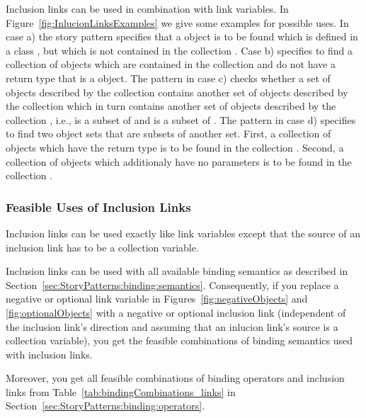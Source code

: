 Inclusion links can be used in combination with link variables.
In Figure~\ref{fig:InlucionLinksExamples} we give some examples for possible uses.
In case a) the story pattern specifies that a  object is to be found which is defined in a class ,
but which is not contained in the collection .
Case b) specifies to find a collection  of  objects which are contained in the collection 
and do not have a return type that is a  object.
The pattern in case c) checks whether a set of objects described by the collection  contains another set of objects described by the collection 
which in turn contains another set of objects described by the collection ,
i.e.,  is a subset of  and  is a subset of .
The pattern in case d) specifies to find two object sets that are subsets of another set.
First, a collection  of  objects which have the return type  is to be found in the collection .
Second, a collection  of  objects which additionaly have no parameters is to be found in the collection .


\subsubsection{Feasible Uses of Inclusion Links}
\label{sec:StoryPatterns:inclusion:feasible}

Inclusion links can be used exactly like link variables except that the source of an inclusion link has to be a collection variable.

Inclusion links can be used with all available binding semantics as described in Section~\ref{sec:StoryPatterns:binding:semantics}.
Consequently, if you replace a negative or optional link variable in Figures~\ref{fig:negativeObjects} and \ref{fig:optionalObjects}
with a negative or optional inclusion link
(independent of the inclusion link's direction and assuming that an inlucion link's source is a collection variable),
you get the feasible combinations of binding semantics used with inclusion links.

Moreover, you get all feasible combinations of binding operators and inclusion links from
Table~\ref{tab:bindingCombinations_links} in Section~\ref{sec:StoryPatterns:binding:operators}.

